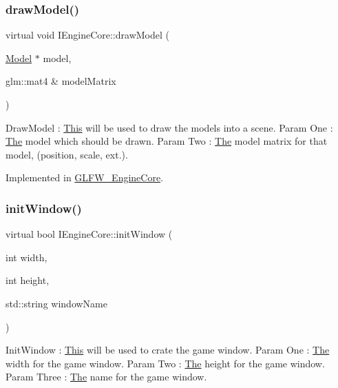 \mbox{\label{class_i_engine_core_a454b3f14b3a567852d891c7543edfef7}} 
\subsubsection{\texorpdfstring{draw\+Model()}{drawModel()}}
{\footnotesize\ttfamily virtual void I\+Engine\+Core\+::draw\+Model (\begin{DoxyParamCaption}\item[{\mbox{\hyperlink{class_model}{Model}} $\ast$}]{model,  }\item[{glm\+::mat4 \&}]{model\+Matrix }\end{DoxyParamCaption})\hspace{0.3cm}{\ttfamily [pure virtual]}}

Draw\+Model \+: \mbox{\hyperlink{class_this}{This}} will be used to draw the models into a scene. Param One \+: \mbox{\hyperlink{class_the}{The}} model which should be drawn. Param Two \+: \mbox{\hyperlink{class_the}{The}} model matrix for that model, (position, scale, ext.). 

Implemented in \mbox{\hyperlink{class_g_l_f_w___engine_core_a51f39fe1ceea2f8c47d7c8e89118139d}{G\+L\+F\+W\+\_\+\+Engine\+Core}}.

\mbox{\label{class_i_engine_core_a27123704f8f24eefd9cb47aa9986cbf3}} 
\subsubsection{\texorpdfstring{init\+Window()}{initWindow()}}
{\footnotesize\ttfamily virtual bool I\+Engine\+Core\+::init\+Window (\begin{DoxyParamCaption}\item[{int}]{width,  }\item[{int}]{height,  }\item[{std\+::string}]{window\+Name }\end{DoxyParamCaption})\hspace{0.3cm}{\ttfamily [pure virtual]}}

Init\+Window \+: \mbox{\hyperlink{class_this}{This}} will be used to crate the game window. Param One \+: \mbox{\hyperlink{class_the}{The}} width for the game window. Param Two \+: \mbox{\hyperlink{class_the}{The}} height for the game window. Param Three \+: \mbox{\hyperlink{class_the}{The}} name for the game window. 

